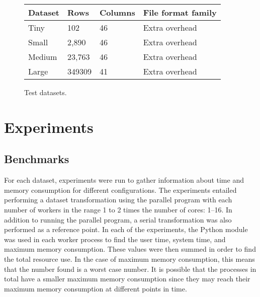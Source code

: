 \begin{figure}[ht]
\centering
\begin{tabular}{|l|l|l|l|}
\hline
Dataset & Rows   & Columns & File format family \\ \hline
Tiny    & 102    & 46      & Extra overhead     \\ \hline
Small   & 2,890  & 46      & Extra overhead     \\ \hline
Medium  & 23,763 & 46      & Extra overhead     \\ \hline
Large  & 349309 & 41      & Extra overhead     \\ \hline
\end{tabular}
\label{fig:test_datasets}
\caption{Test datasets.}
\end{figure}

\section{Experiments}
\subsection{Benchmarks}
For each dataset, experiments were run to gather information about time and memory consumption for different configurations.
The experiments entailed performing a dataset transformation using the parallel program with each number of workers in the range 1 to 2 times the number of cores: 1--16.
In addition to running the parallel program, a serial transformation was also performed as a reference point.
In each of the experiments, the Python  module was used in each worker process to find the user time, system time, and maximum memory consumption.
These values were then summed in order to find the total resource use. In the case of maximum memory consumption, this means that the number found is a worst case
number. It is possible that the processes in total have a smaller maximum memory consumption since they may reach their maximum memory consumption at different
points in time.


